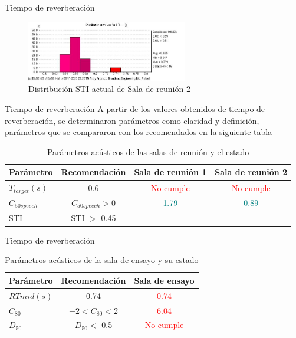 \documentclass{sintefbeamer}
\begin{document}
\begin{frame}{Tiempo de reverberación}
    \begin{figure}
        \centering
        \includegraphics[width=7cm]{images/STI actual/STIdist_Reunion1_SinAcond.jpg}
        \caption{Distribución STI actual de Sala de reunión 2}
        \label{fig:distribución STI actual sala reunion 2}
    \end{figure}
\end{frame}

\begin{frame}{Tiempo de reverberación}
A partir de los valores obtenidos de tiempo de reverberación, se determinaron parámetros como claridad y definición, parámetros que se compararon con los recomendados en la siguiente tabla
     \begin{table}[H]
        \centering
        \begin{tabular}{|l|c|c|c|}
        \hline
          \textbf{Parámetro}  & \textbf{Recomendación} & \textbf{Sala de reunión 1} & \textbf{Sala de reunión 2}\\ \hline
          $T_{target} (s)$ & 0.6 & \textcolor{red}{No cumple} & \textcolor{red}{No cumple}\\ \hline
          $C_{50speech}$ & $C_{50speech}>0$ & \textcolor{teal}{1.79} & \textcolor{teal}{0.89} \\ \hline
          STI& STI $>$ 0.45 & &\\\hline
        \end{tabular}
        \caption{Parámetros acústicos de las salas de reunión y el estado}
        \label{tab: cumplimiento parametros RT de salas de reunión}
    \end{table}
\end{frame}
\begin{frame}{Tiempo de reverberación}
    \begin{table}[H]
        \centering
        \begin{tabular}{|l|c|c|}
        \hline
        \textbf{Parámetro}& \textbf{Recomendación} & \textbf{Sala de ensayo}\\ \hline
        $RT{mid} (s)$&  0.74 & \textcolor{red}{0.74} \\ \hline
        $C_{80}$ & $-2<C_{80}<2$ & \textcolor{red}{6.04} \\\hline
        $D_{50}$ & $D_{50}<$ 0.5 & \textcolor{red}{No cumple} \\\hline
        \end{tabular}
        \caption{Parámetros acústicos de la sala de ensayo y su estado}
        \label{tab:prametros acusticos sala ensayo}
    \end{table}
\end{frame}
\end{document}
